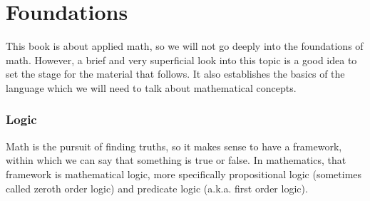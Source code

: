 \section{Foundations} 

This book is about applied math, so we will not go deeply into the foundations of math. However, a brief and very superficial look into this topic is a good idea to set the stage for the material that follows. It also establishes the basics of the language which we will need to talk about mathematical concepts.

\subsubsection{Logic}
Math is the pursuit of finding truths, so it makes sense to have a framework, within which we can say that something is true or false. In mathematics, that framework is mathematical logic, more specifically propositional logic (sometimes called zeroth order logic) and predicate logic (a.k.a. first order logic). 

